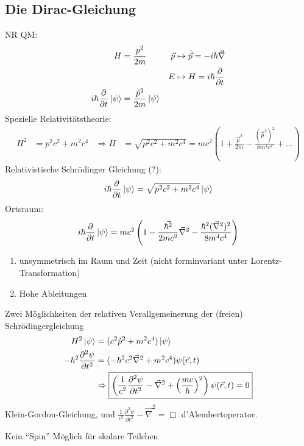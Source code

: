 \subsection{Die Dirac-Gleichung}
NR QM:
	\begin{align*}
		H &= \frac{p^2}{2m} 
		& \vec{p} &\mapsto \hat{\vec{p}} = -i \hbar \vec{\nabla} \\
		& & E &\mapsto H = i \hbar \frac{\partial}{\partial t} \\
		i \hbar \frac{\partial}{\partial t} \ket{\psi} 
		&= \frac{\hat{p}^2}{2m} \ket{\psi} 
	\end{align*}
Spezielle Relativitätstheorie:
	\begin{align*}
		H^2 &= p^2 c^2 + m^2 c^4 
		&\Rightarrow H &= \sqrt{p^2c^2 +m^2 c^4} 
		= mc^2\left(1 + \frac{\vec{p}^2}{2m} - \frac{(\vec{p}^2)^2}{8 m^4 c^4} + \ldots\right)
	\end{align*}
Relativistische Schrödinger Gleichung (?):
	\begin{align*}
		i \hbar \frac{\partial}{\partial t} \ket{\psi} 
		= \sqrt{p^2c^2 +m^2 c^4} \ket{\psi}
	\end{align*}
Ortsraum:
	\begin{align*}
		i \hbar \frac{\partial}{\partial t} \ket{\psi} 
		= mc^2 \left(1 - \frac{\vec{\hbar^2}}{2mc^2}\vec{\nabla}^2 - \frac{\hbar^2(\vec{\nabla}^2)^2}{8 m^4 c^4}\right)
	\end{align*}
	\begin{enumerate}
		\item unsymmetrisch im Raum und Zeit (nicht forminvariant unter Lorentz-Transformation)
		\item Hohe Ableitungen
	\end{enumerate}
Zwei Möglichkeiten der relativen Verallgemeinerung der (freien) Schrödingergleichung 
	\begin{align*}
		H^2 \ket{\psi} &= (c^2 \hat{p}^2 + m^2 c^4) \ket{\psi} \\
		-\hbar^2 \frac{\partial^2 \psi}{\partial t^2}
		&= (-\hbar^2 c^2 \vec{\nabla}^2 + m^2 c^4) \psi (\vec{r} , t) \\
		&\Rightarrow
		\boxed{
			\left(
			\frac{1}{c^2} \frac{\partial^2 \psi}{\partial t^2} - \vec{\nabla}^2 
			+ \left(\frac{mc}{\hbar}\right)^2
			\right)
			\psi (\vec{r} , t) = 0
		}
	\end{align*} 
Klein-Gordon-Gleichung, und $\frac{1}{c^2} \frac{\partial^2 \psi}{\partial t^2} - \vec{\nabla}^2 = \Box$ d'Alembertoperator.

Kein ``Spin'' Möglich für skalare Teilchen

